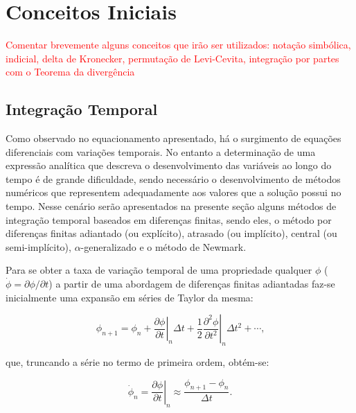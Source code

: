 \section{Conceitos Iniciais} \label{CI}

\textcolor{red}{Comentar brevemente alguns conceitos que irão ser utilizados: notação simbólica, indicial, delta de Kronecker, permutação de Levi-Cevita, integração por partes com o Teorema da divergência}

\subsection{Integração Temporal} \label{MEFP-IntTemp}

Como observado no equacionamento apresentado, há o surgimento de equações diferenciais com variações temporais. No entanto a determinação de uma expressão analítica que descreva o desenvolvimento das variáveis ao longo do tempo é de grande dificuldade, sendo necessário o desenvolvimento de métodos numéricos que representem adequadamente aos valores que a solução possui no tempo. Nesse cenário serão apresentados na presente seção alguns métodos de integração temporal baseados em diferenças finitas, sendo eles, o método por diferenças finitas adiantado (ou explícito), atrasado (ou implícito), central (ou semi-implícito), $\alpha$-generalizado e o método de Newmark.

Para se obter a taxa de variação temporal de uma propriedade qualquer $\phi$ ($\dot{\phi}=\partial\phi/\partial t$) a partir de uma abordagem de diferenças finitas adiantadas faz-se inicialmente uma expansão em séries de Taylor da mesma:

\begin{equation}
    \phi_{n+1}=\phi_n+\left.\frac{\partial\phi}{\partial t}\right|_n\Delta t+\frac{1}{2}\left.\frac{\partial^2\phi}{\partial t^2}\right|_n\Delta t^2+\cdots\text{,}\label{eq:TaylorAd}
\end{equation}

\noindent que, truncando a série no termo de primeira ordem, obtém-se:

\begin{equation}
    \dot{\phi}_n=\left.\frac{\partial\phi}{\partial t}\right|_n\approx\frac{\phi_{n+1}-\phi_n}{\Delta t}\text{.}
\end{equation}


